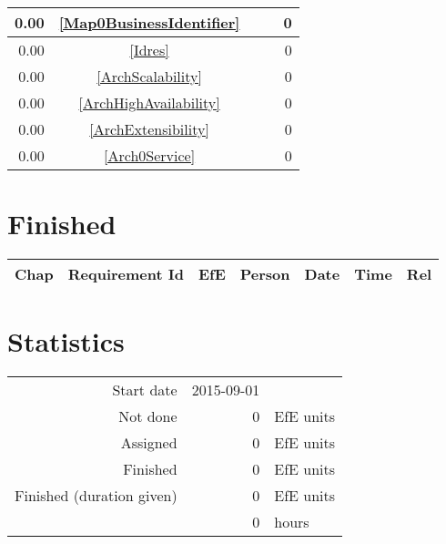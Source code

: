 \begin{longtable}{|r|c|p{7cm}||r|r|}
0.00 & \ref{Map0BusinessIdentifier} & \nameref{Map0BusinessIdentifier} &   & 0 \\ \hline
0.00 & \ref{Idres} & \nameref{Idres} &   & 0 \\ \hline
0.00 & \ref{ArchScalability} & \nameref{ArchScalability} &   & 0 \\ \hline
0.00 & \ref{ArchHighAvailability} & \nameref{ArchHighAvailability} &   & 0 \\ \hline
0.00 & \ref{ArchExtensibility} & \nameref{ArchExtensibility} &   & 0 \\ \hline
0.00 & \ref{Arch0Service} & \nameref{Arch0Service} &   & 0 \\ \hline
\end{longtable}\section{Finished}
{\small \begin{longtable}{|c|p{5.5cm}||r|l|l|r|r|} \hline
\textbf{Chap} & \textbf{Requirement Id} & \textbf{EfE} & \textbf{Person} & \textbf{Date} & \textbf{Time} & \textbf{Rel} \\ \hline\endhead
\end{longtable}}\section{Statistics}
\begin{longtable}{rrl}
Start date & 2015-09-01 & \\ 
Not done & 0 & EfE units \\ 
Assigned & 0 & EfE units \\ 
Finished & 0 & EfE units \\ 
Finished (duration given) & 0 & EfE units \\ 
 & 0 & hours \\ 
\end{longtable}
